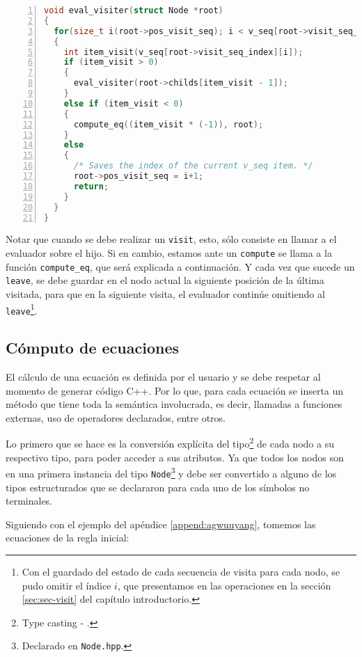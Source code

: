 \begin{lstlisting}[language=C++, basicstyle=\scriptsize, numbers=left, columns=fullflexible, linewidth=13cm]
void eval_visiter(struct Node *root)
{
  for(size_t i(root->pos_visit_seq); i < v_seq[root->visit_seq_index].size(); i++)
  {
    int item_visit(v_seq[root->visit_seq_index][i]);
    if (item_visit > 0)
    {
      eval_visiter(root->childs[item_visit - 1]);
    }
    else if (item_visit < 0)
    {
      compute_eq((item_visit * (-1)), root);
    }
    else
    {
      /* Saves the index of the current v_seq item. */
      root->pos_visit_seq = i+1;
      return;
    }
  }
}
\end{lstlisting}

Notar que cuando se debe realizar un \texttt{visit}, esto, sólo consiste en llamar a el evaluador sobre el hijo. Si en cambio, estamos ante un \texttt{compute} se llama a la función \texttt{compute\_eq}, que será explicada a continuación. Y cada vez que sucede un \texttt{leave}, se debe guardar en el nodo actual la siguiente posición de la última visitada, para que en la siguiente visita, el evaluador continúe omitiendo al \texttt{leave}\footnote{Con el guardado del estado de cada secuencia de visita para cada nodo, se pudo omitir el índice $i$, que presentamos en las operaciones en la sección \ref{sec:sec-visit} del capítulo introductorio.}.

\subsection{Cómputo de ecuaciones}

El cálculo de una ecuación es definida por el usuario y se debe respetar al momento de generar código C++. Por lo que, para cada ecuación se inserta un método que tiene toda la semántica involucrada, es decir, llamadas a funciones externas, uso de operadores declarados, entre otros.

Lo primero que se hace es la conversión explícita del tipo\footnote{Type casting - .} de cada nodo a su respectivo tipo, para poder acceder a sus atributos. Ya que todos los nodos son en una primera instancia del tipo \texttt{Node}\footnote{Declarado en \texttt{Node.hpp}.} y debe ser convertido a alguno de los tipos estructurados que se declararon para cada uno de los símbolos no terminales.

Siguiendo con el ejemplo del apéndice \ref{append:agwuuyang}, tomemos las ecuaciones de la regla inicial:

